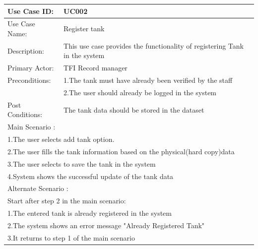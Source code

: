 			\begin{center}		
			\vspace*{1\baselineskip}	
			\begin{tabular}{|l|p{10cm}|}
				\hline
				Use Case ID: & UC002 \\
				\hline
				Use Case Name: & Register tank \\
				\hline
				Description: & This use case provides the functionality of registering Tank in the system \\
				\hline
				Primary Actor: & TFI Record manager \\
				\hline
				Preconditions: & 1.The tank must have already been verified by the staff\\ 
				& 2.The user should already be logged in the system \\
				\hline
				Post Conditions: & The tank data should be stored in the dataset\\
				\hline
				\multicolumn{2}{|l|}{Main Scenario :} \\
				\hline
				\multicolumn{2}{|l|}{1.The user selects add tank option.} \\
				\multicolumn{2}{|l|}{2.The user fills the tank information based on the physical(hard copy)data } \\
				\multicolumn{2}{|l|}{3.The user selects to save the tank in the system} \\
				\multicolumn{2}{|l|}{4.System shows the successful update of the tank data} \\
				\hline
				\multicolumn{2}{|l|}{Alternate Scenario :} \\
				\hline
				\multicolumn{2}{|l|}{Start after step 2 in the main scenario:} \\
				\multicolumn{2}{|l|}{1.The entered tank is already registered in the system} \\
				\multicolumn{2}{|l|}{2.The system shows an error message "Already Registered Tank"} \\
				\multicolumn{2}{|l|}{3.It returns to step 1 of the main scenario} \\
				\hline
			\end{tabular}
			\end{center}	
			
			
